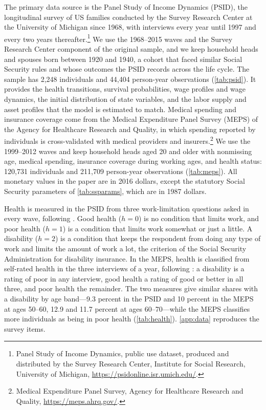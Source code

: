 The primary data source is the Panel Study of Income Dynamics (PSID), the longitudinal survey of US families conducted by the Survey Research Center at the University of Michigan since 1968, with interviews every year until 1997 and every two years thereafter.\footnote{Panel Study of Income Dynamics, public use dataset, produced and distributed by the Survey Research Center, Institute for Social Research, University of Michigan, \url{https://psidonline.isr.umich.edu/}.} %
We use the 1968--2015 waves and the Survey Research Center component of the original sample, and we keep household heads and spouses born between 1920 and 1940, a cohort that faced similar Social Security rules and whose outcomes the PSID records across the life cycle. %
The sample has 2,248 individuals and 44,404 person-year observations (\autoref{tab:psid}). %
It provides the health transitions, survival probabilities, wage profiles and wage dynamics, the initial distribution of state variables, and the labor supply and asset profiles that the model is estimated to match. %
Medical spending and insurance coverage come from the Medical Expenditure Panel Survey (MEPS) of the Agency for Healthcare Research and Quality, in which spending reported by individuals is cross-validated with medical providers and insurers.\footnote{Medical Expenditure Panel Survey, Agency for Healthcare Research and Quality, \url{https://meps.ahrq.gov/}.} %
We use the 1999--2012 waves and keep household heads aged 20 and older with nonmissing age, medical spending, insurance coverage during working ages, and health status: 120,731 individuals and 211,709 person-year observations (\autoref{tab:meps}). %
All monetary values in the paper are in 2016 dollars, except the statutory Social Security parameters of \autoref{tab:ssparams}, which are in 1987 dollars. %

Health is measured in the PSID from three work-limitation questions asked in every wave, following \citet{Low2015}. Good health ($h=0$) is no condition that limits work, and poor health ($h=1$) is a condition that limits work somewhat or just a little. A disability ($h=2$) is a condition that keeps the respondent from doing any type of work and limits the amount of work a lot, the criterion of the Social Security Administration for disability insurance. %
In the MEPS, health is classified from self-rated health in the three interviews of a year, following \citet{Pashchenko2019}: a disability is a rating of poor in any interview, good health a rating of good or better in all three, and poor health the remainder. %
The two measures give similar shares with a disability by age band---9.3 percent in the PSID and 10 percent in the MEPS at ages 50--60, 12.9 and 11.7 percent at ages 60--70---while the MEPS classifies more individuals as being in poor health (\autoref{tab:health}). %
\autoref{app:data} reproduces the survey items.

